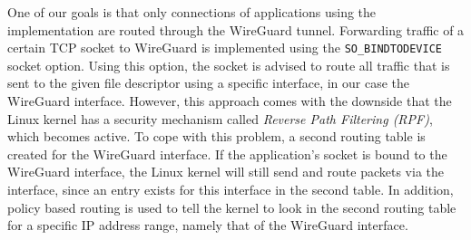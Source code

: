

One of our goals is that only connections of applications using the \ld implementation are routed through the WireGuard tunnel.
Forwarding traffic of a certain TCP socket to WireGuard is implemented using the \texttt{SO\_BINDTODEVICE} socket option.
Using this option, the socket is advised to route all traffic that is sent to the given file descriptor using a specific interface, in our case the WireGuard interface.
However, this approach comes with the downside that the Linux kernel has a security mechanism called \textit{Reverse Path Filtering (RPF)}, which becomes active.
To cope with this problem, a second routing table is created for the WireGuard interface.
If the application's socket is bound to the WireGuard interface, the Linux kernel will still send and route packets via the interface, since an entry exists for this interface in the second table.
In addition, policy based routing is used to tell the kernel to look in the second routing table for a specific IP address range, namely that of the WireGuard interface.
 
